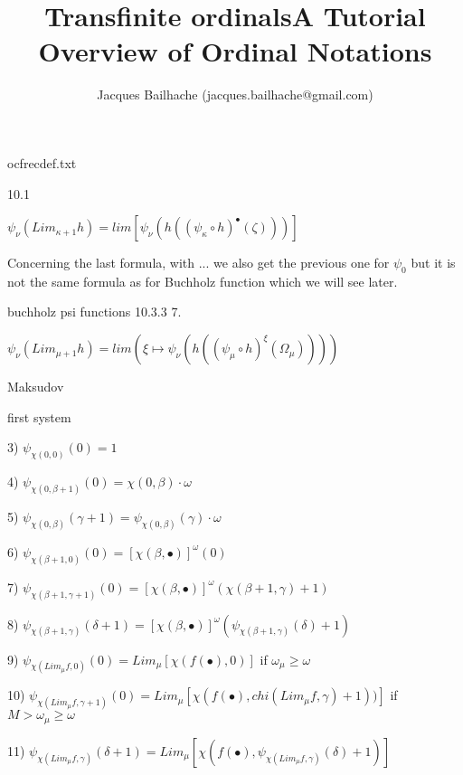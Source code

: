 \documentclass[10pt]{article}
\title{Transfinite ordinals}
\begin{document}
\title{A Tutorial Overview of Ordinal Notations}
\author{Jacques Bailhache (jacques.bailhache@gmail.com)}

\maketitle

\setlength{\parindent}{0pt}

ocfrecdef.txt

10.1

\( \psi_\nu (Lim_{\kappa+1} h) = lim [ \psi_\nu (h ((\psi_\kappa \circ h)^\bullet (\zeta)))] \)

Concerning the last formula, with ... we also get the previous one for \( \psi_0 \) but it is not the same formula as for Buchholz function which we will see later.


buchholz psi functions
10.3.3 7.

\( \psi_\nu(Lim_{\mu+1} h) = lim (\xi \mapsto \psi_\nu (h ((\psi_\mu \circ h)^\xi (\Omega_\mu)))) \) 

\bigskip

Maksudov

first system

\bigskip

3) \( \psi_{\chi(0,0)}(0) = 1 \)

4) \( \psi_{\chi(0,\beta+1)}(0) = \chi(0,\beta) \cdot \omega \)

5) \( \psi_{\chi(0,\beta)}(\gamma+1) = \psi_{\chi(0,\beta)}(\gamma) \cdot \omega \)

\bigskip

6) \( \psi_{\chi(\beta+1,0)}(0) = [\chi(\beta,\bullet)]^\omega (0) \)

7) \( \psi_{\chi(\beta+1,\gamma+1)}(0) = [\chi(\beta,\bullet)]^\omega (\chi(\beta+1,\gamma)+1) \)

8) \( \psi_{\chi(\beta+1,\gamma)}(\delta+1) = [\chi(\beta,\bullet)]^\omega (\psi_{\chi(\beta+1,\gamma)}(\delta)+1) \)

\bigskip

9) \( \psi_{\chi(Lim_\mu f,0)}(0) = Lim_\mu [\chi(f(\bullet),0)] \) if \( \omega_\mu \ge \omega \)

10) \( \psi_{\chi(Lim_\mu f,\gamma+1)}(0) = Lim_\mu [\chi(f(\bullet),chi(Lim_\mu f,\gamma)+1))] \) if \( M > \omega_\mu \ge \omega \)

11) \( \psi_{\chi(Lim_\mu f,\gamma)}(\delta+1) = Lim_\mu [\chi(f(\bullet),\psi_{\chi(Lim_\mu f,\gamma)}(\delta)+1)] \)

\bigskip
\end{document}
